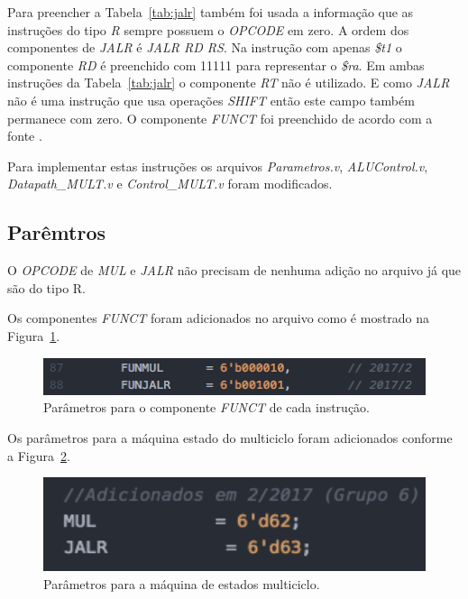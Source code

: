 \documentclass[12pt]{article}
\begin{document}
Para preencher a Tabela~\ref{tab:jalr} também foi usada a informação que as instruções do tipo \textit{R} sempre possuem o \textit{OPCODE} em zero. A ordem dos componentes de \textit{JALR} é \textit{JALR RD RS}. Na instrução com apenas \textit{\$t1} o componente \textit{RD} é preenchido com 11111 para representar o \textit{\$ra}. Em ambas instruções da Tabela~\ref{tab:jalr} o componente \textit{RT} não é utilizado. E como \textit{JALR} não é uma instrução que usa operações \textit{SHIFT} então este campo também permanece com zero. O componente \textit{FUNCT} foi preenchido de acordo com a fonte \cite{mips32}.

Para implementar estas instruções os arquivos \textit{Parametros.v}, \textit{ALUControl.v}, \textit{Datapath\_MULT.v} e \textit{Control\_MULT.v} foram modificados. 

\subsection{Parêmtros}
\label{subsec:param}

O \textit{OPCODE} de \textit{MUL} e \textit{JALR} não precisam de nenhuma adição no arquivo já que são do tipo R.

Os componentes \textit{FUNCT} foram adicionados no arquivo como é mostrado na Figura~\ref{fig:pfunct}.

\begin{figure}[H]
	\flushleft
	\includegraphics[width=1\textwidth]{pfunct.png}
	\caption{Parâmetros para o componente \textit{FUNCT} de cada instrução.}
	\label{fig:pfunct}
\end{figure}

Os parâmetros para a máquina estado do multiciclo foram adicionados conforme a Figura~\ref{fig:pest}.

\begin{figure}[H]
	\flushleft
	\includegraphics[width=1\textwidth]{pest.png}
	\caption{Parâmetros para a máquina de estados multiciclo.}
	\label{fig:pest}
\end{figure}
\end{document}
